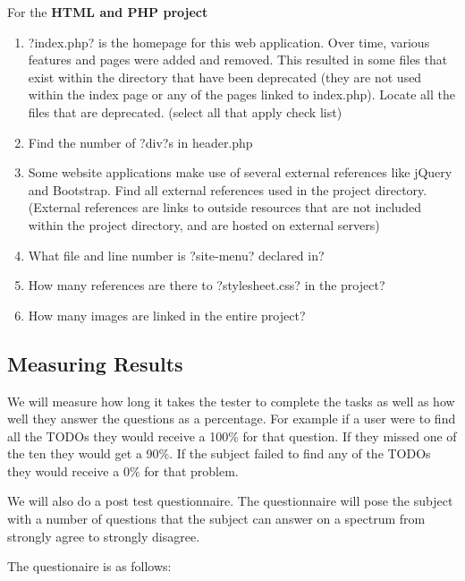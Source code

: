 \documentclass[letterpaper,10pt,titlepage,draftclsnofoot,onecolumn,onesided] {IEEEtran}
\begin{document}
	For the \textbf{HTML and PHP project}
	\begin{enumerate}
		\item ?index.php? is the homepage for this web application. Over time, various features and pages were added and removed. This resulted in some files that exist within the directory that have been deprecated (they are not used within the index page or any of the pages linked to index.php). Locate all the files that are deprecated. (select all that apply check list)

		\item Find the number of ?div?s in header.php
		\item Some website applications make use of several external references like jQuery and Bootstrap. Find all external references used in the project directory. (External references are links to outside resources that are not included within the project directory, and are hosted on external servers)

		\item What file and line number is ?site-menu? declared in?
		\item How many references are there to ?stylesheet.css? in the project?
		\item How many images are linked in the entire project?
	\end{enumerate}
	
	\subsection{Measuring Results}
	We will measure how long it takes the tester to complete the tasks as well as how well they answer the questions as a percentage. 
	For example if a user were to find all the TODOs they would receive a 100\% for that question. 
	If they missed one of the ten they would get a 90\%.
	If the subject failed to find any of the TODOs they would receive a 0\% for that problem.

	We will also do a post test questionnaire. 
	The questionnaire will pose the subject with a number of questions that the subject can answer on a spectrum from strongly agree to strongly disagree.

	The questionaire is as follows: 
	
\end{document}
